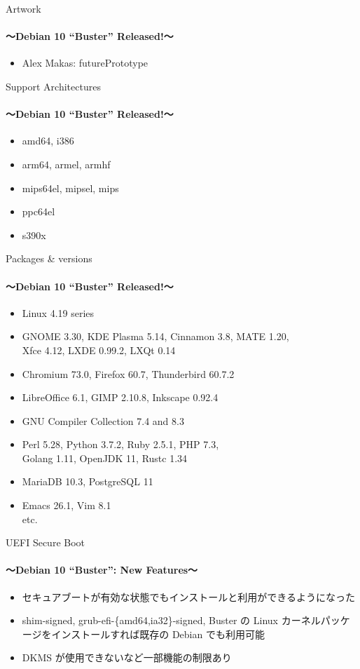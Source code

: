 \documentclass[cjk,c,squeeze,shrink,dvipdfmx,12pt,handout]{beamer}
\begin{document}
\begin{frame}[fragile]{Artwork}
  \framesubtitle{〜Debian 10 ``Buster'' Released!〜}
  \begin{itemize}
  \item Alex Makas: futurePrototype
  \end{itemize}
  \begin{center}
  \end{center}
\end{frame}

\begin{frame}[fragile]{Support Architectures}
  \framesubtitle{〜Debian 10 ``Buster'' Released!〜}
  \begin{itemize}
  \item amd64, i386
  \item arm64, armel, armhf
  \item mips64el, mipsel, mips
  \item ppc64el
  \item s390x
  \end{itemize}
\end{frame}

\begin{frame}[fragile]{Packages \& versions}
  \framesubtitle{〜Debian 10 ``Buster'' Released!〜}
  \begin{itemize}
  \item Linux 4.19 series
  \item GNOME 3.30, KDE Plasma 5.14, Cinnamon 3.8, MATE 1.20,\\
    Xfce 4.12, LXDE 0.99.2, LXQt 0.14
  \item Chromium 73.0, Firefox 60.7, Thunderbird 60.7.2
  \item LibreOffice 6.1, GIMP 2.10.8, Inkscape 0.92.4
  \item GNU Compiler Collection 7.4 and 8.3
  \item Perl 5.28, Python 3.7.2, Ruby 2.5.1, PHP 7.3, \\
    Golang 1.11, OpenJDK 11, Rustc 1.34
  \item MariaDB 10.3, PostgreSQL 11
  \item Emacs 26.1, Vim 8.1 \\
    etc.
  \end{itemize}
\end{frame}

\begin{frame}[fragile]{UEFI Secure Boot}
  \framesubtitle{〜Debian 10 ``Buster'': New Features〜}
  \begin{itemize}
  \item セキュアブートが有効な状態でもインストールと利用ができるようになった
  \item shim-signed, grub-efi-\{amd64,ia32\}-signed, Buster の Linux カーネルパッケージをインストールすれば既存の Debian でも利用可能
  \item DKMS が使用できないなど一部機能の制限あり
  \end{itemize}
\end{frame}
\end{document}
